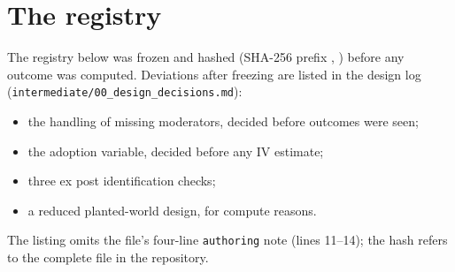 \documentclass[11pt]{article}
\theoremstyle{remark}\newtheorem{remark}{Remark}
\begin{document}
\section{The registry}\label{sec:registry}
\begin{sloppypar}
The registry below was frozen and hashed (SHA-256 prefix \texttt{\RegistryHash}, \RegistryTime) before any outcome was
computed. Deviations after freezing are listed in the design log (\nolinkurl{intermediate/00_design_decisions.md}):
\end{sloppypar}
\begin{itemize}
\item the handling of missing moderators, decided before outcomes were seen;
\item the adoption variable, decided before any IV estimate;
\item three ex post identification checks;
\item a reduced planted-world design, for compute reasons.
\end{itemize}
The listing omits the file's four-line \texttt{authoring} note (lines 11--14); the hash refers to the complete file in
the repository.


\end{document}
